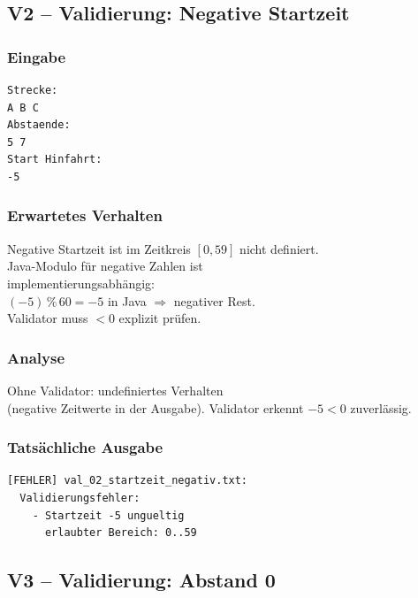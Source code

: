 \documentclass[12pt,a4paper]{article}
\begin{document}
\subsection{V2 – Validierung: Negative Startzeit}
\label{test:v2}

\noindent
\begin{minipage}[t]{0.48\textwidth}
\scriptsize
\setlength{\tabcolsep}{2pt}

\subsubsection*{Eingabe}
\begin{lstlisting}
Strecke:
A B C
Abstaende:
5 7
Start Hinfahrt:
-5
\end{lstlisting}

\subsubsection*{Erwartetes Verhalten}
Negative Startzeit ist im Zeitkreis $[0,59]$ nicht definiert.\\
Java-Modulo für negative Zahlen ist\\
implementierungsabhängig:\\
$(-5)\,\%\,60 = -5$ in Java $\Rightarrow$ negativer Rest.\\
Validator muss $< 0$ explizit prüfen.

\subsubsection*{Analyse}
Ohne Validator: undefiniertes Verhalten\\
(negative Zeitwerte in der Ausgabe).
Validator erkennt $-5 < 0$ zuverlässig.
\end{minipage}
\hfill
\begin{minipage}[t]{0.48\textwidth}
\scriptsize
\subsubsection*{Tatsächliche Ausgabe}
\begin{lstlisting}
[FEHLER] val_02_startzeit_negativ.txt:
  Validierungsfehler:
    - Startzeit -5 ungueltig
      erlaubter Bereich: 0..59
\end{lstlisting}
\end{minipage}

\subsection{V3 – Validierung: Abstand 0}
\label{test:v3}
\end{document}
